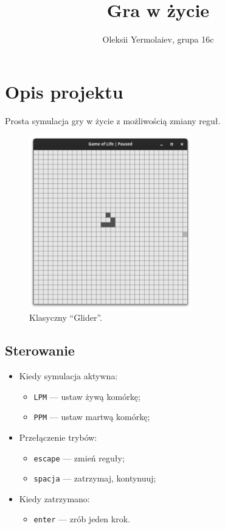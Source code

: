 \documentclass{article}
\title{Gra w życie}
\author{Oleksii Yermolaiev, grupa 16c}
\begin{document}
\maketitle

\section{Opis projektu}

Prosta symulacja gry w życie z możliwością zmiany reguł.

\begin{figure}[h]
\centering
\includegraphics[width=200pt]{screenshots/glider.png}
\caption{Klasyczny ``Glider''.}
\end{figure}

\subsection{Sterowanie}
\begin{itemize}
  \item Kiedy symulacja aktywna:
    \begin{itemize}
      \item \texttt{LPM} --- ustaw żywą komórkę;
      \item \texttt{PPM} --- ustaw martwą komórkę;
    \end{itemize}
  \item Przełączenie trybów:
    \begin{itemize}
      \item \texttt{escape} --- zmień reguły;
      \item \texttt{spacja} --- zatrzymaj, kontynuuj;
    \end{itemize}
  \item Kiedy zatrzymano:
    \begin{itemize}
      \item \texttt{enter}  --- zrób jeden krok.
    \end{itemize}
\end{itemize}
\end{document}
